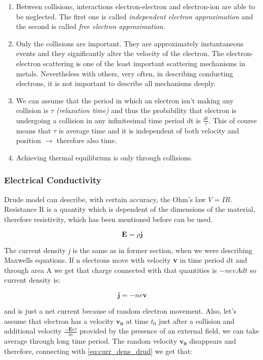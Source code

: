 \begin{enumerate}
\item Between collisions, interactions electron-electron and electron-ion are able to be neglected. The first one is called \textit{independent electron approximation} and the second is called \textit{free electron approximation}. 
\item Only the collisions are important. They are approximately instantaneous events and they significantly alter the velocity of the electron. The electron-electron scattering is one of the least important scattering mechanisms in metals. Nevertheless with others, very often, in describing conducting electrons, it is not important to describe all mechanisms deeply. 
\item We can assume that the period in which an electron isn't making any collision is $\tau$ \textit{(relaxation time)} and thus the probability that electron is undergoing a collision in any infinitesimal time period dt is $\frac{dt}{\tau}$. This of course means that $\tau$ is average time and it is independent of both velocity and position $\rightarrow$ therefore also time. 
\item Achieving thermal equilibrium is only through collisions.
\end{enumerate}

\subsubsection{Electrical Conductivity}

Drude model can describe, with certain accuracy, the Ohm's law $V=IR$. Resistance R is a quantity which is dependent of the dimensions of the material, therefore resistivity, which has been mentioned before can be used.

\begin{equation}
\mathbf{E}=\rho\mathbf{j}
\end{equation}

The current density \textit{j} is the same as in former section, when we were describing Maxwells equations. If n electrons move with velocity \textbf{v} in time period dt and through area A we get that charge connected with that quantities is $-nevAdt$ so current density is:

\begin{equation}
\mathbf{j}=-ne\mathbf{v}
\label{eq:curr_dens_drud}
\end{equation}

and is just a net current because of random electron movement. 
Also, let's assume that electron has a velocity $\mathbf{v_0}$ at time $t_0$ just after a collision and additional velocity $\frac{-\mathbf{E}e\tau}{m}$ provided by the presence of an external field, we can take average through long time period. The random velocity $\mathbf{v_0}$ disappears and therefore, connecting with \ref{eq:curr_dens_drud} we get that:

